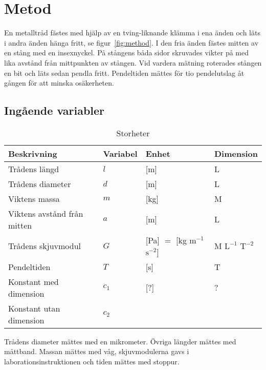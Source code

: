 \documentclass[a4paper,12pt]{article}
\begin{document}
\section{Metod}

En metalltråd fästes med hjälp av en tving-liknande klämma i ena änden och läts
i andra änden hänga fritt, se figur~\ref{fig:method}. I den fria änden fästes
mitten av en stång med en insexnyckel. På stångens båda sidor skruvades vikter
på med lika avstånd från mittpunkten av stången. Vid vardera mätning roterades
stången en bit och läts sedan pendla fritt. Pendeltiden mättes för tio
pendelutslag åt gången för att minska osäkerheten.

\subsection{Ingående variabler}

\begin{table}[h!]
  \caption{Storheter}
  \label{tab:storheter}
  \begin{tabular} {| l | l | l | l |}
    \hline
    \textbf{Beskrivning} & \textbf{Variabel} & \textbf{Enhet} & \textbf{Dimension} \\\hline
    Trådens längd & $l$ & [m] & L \\\hline
    Trådens diameter & $d$ & [m] & L \\\hline
    Viktens massa & $m$ & [kg] & M \\\hline
    Viktens avstånd från mitten & $a$ & [m] & L \\\hline
    Trådens skjuvmodul & $G$ & [Pa] $=$ [kg $\mathrm{m}^{-1}$ $\mathrm{s}^{-2}$] & M $\mathrm{L}^{-1}$ $\mathrm{T}^{-2}$ \\\hline
    Pendeltiden & $T$ & [s] & T \\\hline
    Konstant med dimension & $c_1$ & [?] & ? \\\hline
    Konstant utan dimension & $c_2$ && \\\hline
  \end{tabular}
\end{table}

Trådens diameter mättes med en mikrometer. Övriga längder mättes med måttband.
Massan mättes med våg, skjuvmodulerna gavs i laborationsinstruktionen och
tiden mättes med stoppur.
\end{document}
